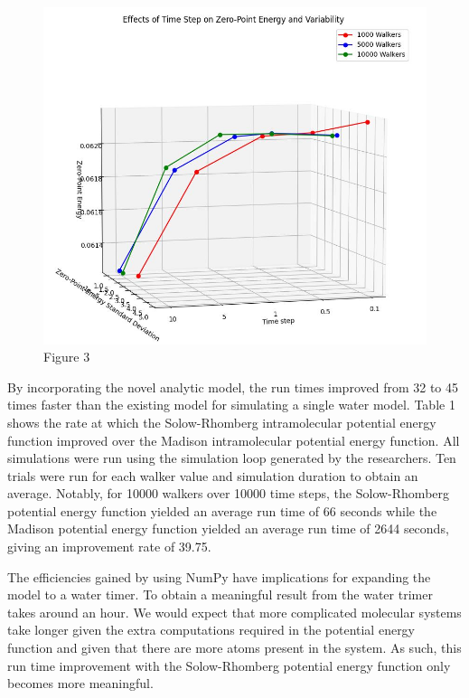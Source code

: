 \documentclass[journal=jacsat,manuscript=article]{achemso}
\begin{document}
\begin{figure}[H]
  \includegraphics[width=\linewidth]{fig_3.jpg}
  \caption{Figure 3}
  \label{fig:}
\end{figure}

By incorporating the novel analytic model, the run times improved from 32 to 45 times faster than the existing model for simulating a single water model. Table 1 shows the rate at which the Solow-Rhomberg intramolecular potential energy function improved over the Madison intramolecular potential energy function. All simulations were run using the simulation loop generated by the researchers. Ten trials were run for each walker value and simulation duration to obtain an average. Notably, for 10000 walkers over 10000 time steps, the Solow-Rhomberg potential energy function yielded an average run time of 66 seconds while the Madison potential energy function yielded an average run time of 2644 seconds, giving an improvement rate of 39.75.

The efficiencies gained by using NumPy have implications for expanding the model to a water timer. To obtain a meaningful result from the water trimer takes around an hour. We would expect that more complicated molecular systems take longer given the extra computations required in the potential energy function and given that there are more atoms present in the system. As such, this run time improvement with the Solow-Rhomberg potential energy function only becomes more meaningful.
\end{document}
